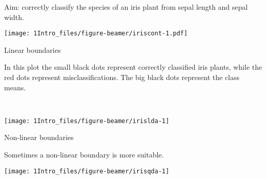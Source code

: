 \documentclass[10pt,ignorenonframetext,]{beamer}
\begin{document}
\begin{frame}

Aim: correctly classify the species of an iris plant from sepal length
and sepal width.

\texttt{[image: 1Intro\_files/figure-beamer/iriscont-1.pdf]}

\end{frame}

\begin{frame}

\begin{block}{Linear boundaries}

\vspace{2mm}

In this plot the small black dots represent correctly classified iris
plants, while the red dots represent misclassifications. The big black
dots represent the class means.

~

\texttt{[image: 1Intro\_files/figure-beamer/irislda-1]}

\end{block}

\end{frame}

\begin{frame}

\begin{block}{Non-linear boundaries}

\vspace{2mm}

Sometimes a non-linear boundary is more suitable. ~

\texttt{[image: 1Intro\_files/figure-beamer/irisqda-1]}

\end{block}

\end{frame}
\end{document}
